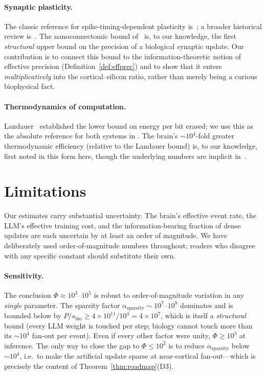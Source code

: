 \documentclass[11pt]{article}
\theoremstyle{definition}
\theoremstyle{remark}
\begin{document}
\paragraph{Synaptic plasticity.}
The classic reference for spike-timing-dependent plasticity
is~\cite{bi2001synaptic}; a broader historical review
is~\cite{markram2011history}.  The nanoconnectomic bound
of~\cite{bartol2015nanoconnectomic} is, to our knowledge, the first
\emph{structural} upper bound on the precision of a biological
synaptic update.  Our contribution is to connect this bound to the
information-theoretic notion of effective precision
(Definition~\ref{def:effprec}) and to show that it enters
\emph{multiplicatively} into the cortical--silicon ratio, rather
than merely being a curious biophysical fact.

\paragraph{Thermodynamics of computation.}
Landauer~\cite{landauer1961irreversibility} established the lower
bound on energy per bit erased; we use this as the absolute
reference for both systems in .  The
brain's $\sim\!10^{4}$-fold greater thermodynamic efficiency
(relative to the Landauer bound) is, to our knowledge, first noted
in this form here, though the underlying numbers are implicit
in~\cite{attwell2001energy,lennie2003cost}.

\section{Limitations}
\label{sec:limits}

Our estimates carry substantial uncertainty.  The brain's effective
event rate, the LLM's effective training cost, and the
information-bearing fraction of dense updates are each uncertain by
at least an order of magnitude.  We have deliberately used
order-of-magnitude numbers throughout; readers who disagree with any
specific constant should substitute their own.

\paragraph{Sensitivity.}
The conclusion $\Phi\approx 10^{3}$--$10^{5}$ is robust to
order-of-magnitude variation in any \emph{single} parameter.  The
sparsity factor $\alpha_{\mathrm{sparsity}}\sim 10^{7}$--$10^{8}$
dominates and is bounded below by $P/s_{\mathrm{bio}}\ge
4\times 10^{11}/10^{4}=4\times 10^{7}$, which is itself a
\emph{structural} bound (every LLM weight is touched per step;
biology cannot touch more than its $\sim\!10^{4}$ fan-out per event).
Even if every other factor were unity, $\Phi\ge 10^{3}$ at
inference.  The only way to close the gap to $\Phi\le 10^{2}$ is to
reduce $\alpha_{\mathrm{sparsity}}$ below $\sim\!10^{4}$, i.e.\ to
make the artificial update sparse at near-cortical fan-out---which is
precisely the content of Theorem~\ref{thm:roadmap}(D3).
\end{document}

